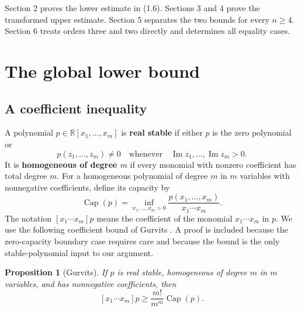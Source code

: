 \documentclass[11pt]{article}
\newtheorem{proposition}[theorem]{Proposition}
\begin{document}
Section 2 proves the lower estimate in (1.6). Sections 3 and 4 prove the
transformed upper estimate. Section 5 separates the two bounds for every
$n\ge4$. Section 6 treats orders three and two directly and determines all
equality cases.

\section{The global lower bound}

\subsection{A coefficient inequality}

A polynomial $p\in\mathbb R[x_1,\ldots,x_m]$ is \textbf{real stable} if either
$p$ is the zero polynomial or
\[
p(z_1,\ldots,z_m)\ne0
\quad\text{whenever}\quad
\operatorname{Im}z_1,\ldots,\operatorname{Im}z_m>0.
\]
It is \textbf{homogeneous of degree $m$} if every monomial with nonzero coefficient
has total degree $m$. For a homogeneous polynomial of degree $m$ in $m$
variables with nonnegative coefficients, define its capacity by
\[
\operatorname{Cap}(p)=
\inf_{x_1,\ldots,x_m>0}
\frac{p(x_1,\ldots,x_m)}{x_1\cdots x_m}.
\tag{2.1}
\]
The notation $[x_1\cdots x_m]p$ means the coefficient of the monomial
$x_1\cdots x_m$ in $p$. We use the following coefficient bound of Gurvits
\cite[Theorem~2.4 and Corollary~2.5]{ref10}. A proof is included because the
zero-capacity boundary case requires care and because the bound is the only
stable-polynomial input to our argument.

\begin{proposition}[Gurvits]
If $p$ is real stable, homogeneous of degree
$m$ in $m$ variables, and has nonnegative coefficients, then
\[
[x_1\cdots x_m]p\ge\frac{m!}{m^m}\operatorname{Cap}(p).
\tag{2.2}
\]
\end{proposition}
\end{document}
